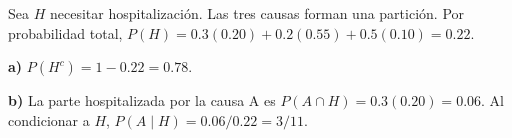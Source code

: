 Sea $H$ necesitar hospitalización. Las tres causas
forman una partición. Por probabilidad total,
$P(H)=0.3(0.20)+0.2(0.55)+0.5(0.10)=0.22$.

\textbf{a)} $P(H^c)=1-0.22=\boxed{0.78}$.

\textbf{b)} La parte hospitalizada por la causa A es
$P(A\cap H)=0.3(0.20)=0.06$. Al condicionar a $H$,
$P(A\mid H)=0.06/0.22=\boxed{3/11}$.
